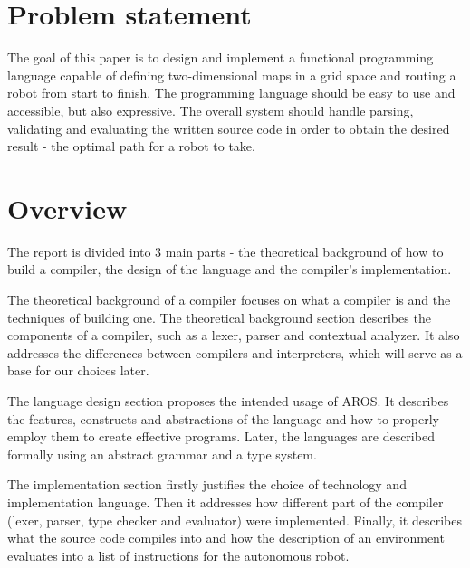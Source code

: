 \section{Problem statement}
\label{sec:intro:statement}
The goal of this paper is to design and implement a functional programming language capable of defining two-dimensional maps in a grid space and routing a robot from start to finish. The programming language should be easy to use and accessible, but also expressive. The overall system should handle parsing, validating and evaluating the written source code in order to obtain the desired result - the optimal path for a robot to take. 

\section{Overview}
\par
The report is divided into 3 main parts - the theoretical background of how to build a compiler, the design of the language and the compiler's implementation.

\par 
The theoretical background of a compiler focuses on what a compiler is and the techniques of building one. The theoretical background section describes the components of a compiler, such as a lexer, parser and contextual analyzer. It also addresses the differences between compilers and interpreters, which will serve as a base for our choices later.  

\par 
The language design section proposes the intended usage of AROS. It describes the features, constructs and abstractions of the language and how to properly employ them to create effective programs. Later, the languages are described formally using an abstract grammar and a type system.

\par 
The implementation section firstly justifies the choice of technology and implementation language. Then it addresses how different part of the compiler (lexer, parser, type checker and evaluator) were implemented. Finally, it describes what the source code compiles into and how the description of an environment evaluates into a list of instructions for the autonomous robot.